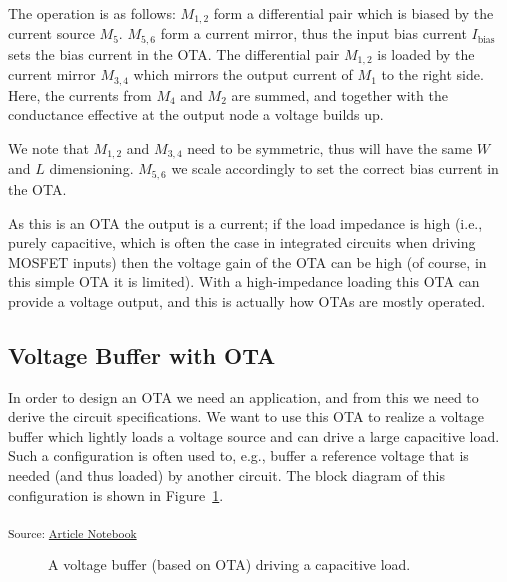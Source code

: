 \documentclass[
  a4paper,
  DIV=11,
  numbers=noendperiod]{scrartcl}
\begin{document}
The operation is as follows: \(M_{1,2}\) form a differential pair which
is biased by the current source \(M_5\). \(M_{5,6}\) form a current
mirror, thus the input bias current \(I_\mathrm{bias}\) sets the bias
current in the OTA. The differential pair \(M_{1,2}\) is loaded by the
current mirror \(M_{3,4}\) which mirrors the output current of \(M_1\)
to the right side. Here, the currents from \(M_4\) and \(M_2\) are
summed, and together with the conductance effective at the output node a
voltage builds up.

We note that \(M_{1,2}\) and \(M_{3,4}\) need to be symmetric, thus will
have the same \(W\) and \(L\) dimensioning. \(M_{5,6}\) we scale
accordingly to set the correct bias current in the OTA.

As this is an OTA the output is a current; if the load impedance is high
(i.e., purely capacitive, which is often the case in integrated circuits
when driving MOSFET inputs) then the voltage gain of the OTA can be high
(of course, in this simple OTA it is limited). With a high-impedance
loading this OTA can provide a voltage output, and this is actually how
OTAs are mostly operated.

\subsection{Voltage Buffer with OTA}\label{voltage-buffer-with-ota}

In order to design an OTA we need an application, and from this we need
to derive the circuit specifications. We want to use this OTA to realize
a voltage buffer which lightly loads a voltage source and can drive a
large capacitive load. Such a configuration is often used to, e.g.,
buffer a reference voltage that is needed (and thus loaded) by another
circuit. The block diagram of this configuration is shown in
Figure~\ref{fig-voltage-buffer-ota}.

\textsubscript{Source:
\href{https://iic-jku.github.io/analog-circuit-design/index.qmd.html}{Article
Notebook}}

\begin{figure}[H]


\caption{\label{fig-voltage-buffer-ota}A voltage buffer (based on OTA)
driving a capacitive load.}

\end{figure}%
\end{document}
